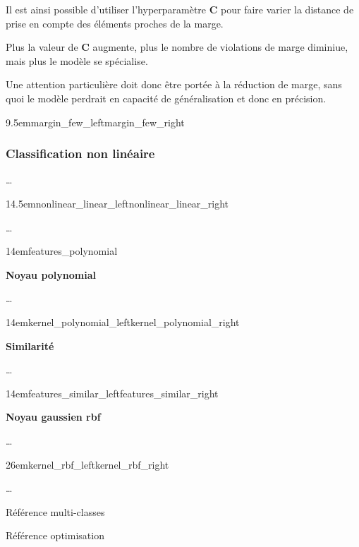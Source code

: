 Il est ainsi possible d’utiliser l’hyperparamètre \textbf{C} pour faire
varier la distance de prise en compte des éléments proches de la marge.

Plus la valeur de \textbf{C} augmente, plus le nombre de violations de
marge diminiue, mais plus le modèle se spécialise.

Une attention particulière doit donc être portée à la réduction de marge,
sans quoi le modèle perdrait en capacité de généralisation
et donc en précision.

{9.5em}{margin_few_left}{margin_few_right}

\pagebreak

\subsubsection{Classification non linéaire}

…

{14.5em}{nonlinear_linear_left}{nonlinear_linear_right}

…

{14em}{features_polynomial}

\pagebreak

\textbf{Noyau polynomial}

…

{14em}{kernel_polynomial_left}{kernel_polynomial_right}

\textbf{Similarité}

…

{14em}{features_similar_left}{features_similar_right}

\textbf{Noyau gaussien \gls{rbf}}

…

{26em}{kernel_rbf_left}{kernel_rbf_right}

…

Référence multi-classes \cite{multi-class}

Référence optimisation \cite{mri} \cite{optimization}

\pagebreak
